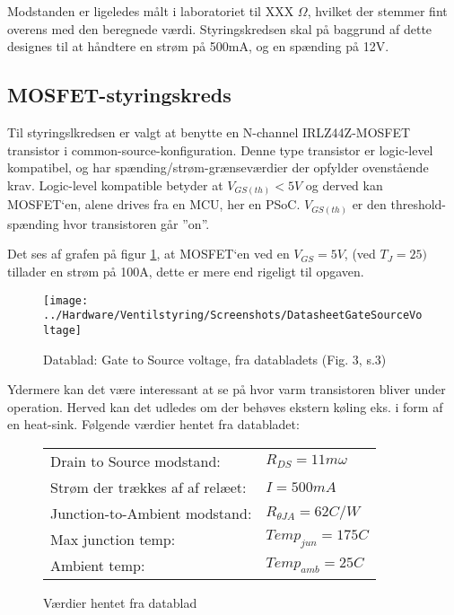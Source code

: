 Modstanden er ligeledes målt i laboratoriet til XXX $\Omega$, hvilket der stemmer fint overens med den beregnede værdi.
Styringskredsen skal på baggrund af dette designes til at håndtere en strøm på 500mA, og en spænding på 12V. 


\newpage
\subsection{MOSFET-styringskreds}
Til styringslkredsen er valgt at benytte en N-channel IRLZ44Z-MOSFET transistor i common-source-konfiguration. Denne type transistor er logic-level kompatibel, og har spænding/strøm-grænseværdier der opfylder ovenstående krav.  
Logic-level kompatible betyder at $ V_{GS(th)} < 5V $ og derved kan MOSFET`en, alene drives fra en MCU, her en PSoC.
$ V_{GS(th)} $ er den threshold-spænding hvor transistoren går ”on”.


Det ses af grafen på figur \ref{screenshot:GateToSourceVoltage}, at MOSFET`en ved en $ V_{GS} = 5V $, (ved $T_J = 25)$ tillader en strøm på 100A, dette er mere end rigeligt til opgaven.

\begin{figure}[!h]
	\centering
	\texttt{[image: ../Hardware/Ventilstyring/Screenshots/DatasheetGateSourceVoltage]}
	\caption{Datablad: Gate to Source voltage, fra databladets (Fig. 3, s.3)}
	\label{screenshot:GateToSourceVoltage}
\end{figure}

Ydermere kan det være interessant at se på hvor varm transistoren bliver under operation. Herved kan det udledes om der behøves ekstern køling eks. i form af en heat-sink.
Følgende værdier hentet fra databladet: 

\begin{figure}[!h]
	\begin{center}
		\begin{tabular}{ l l }
 			Drain to Source modstand:          & $R_{DS}=11 m\omega$ \\ 
 			Strøm der trækkes af af relæet:    & $I = 500 mA$ \\  
 			Junction-to-Ambient modstand:      & $R_{\theta JA}=62 C/W$ \\   
 			Max junction temp:                 & $Temp_{jun}=175 C$ \\
 			Ambient temp:                      & $Temp_{amb}=25 C$ \\
		\end{tabular}
	\end{center}
\caption{Værdier hentet fra datablad}
\end{figure}

